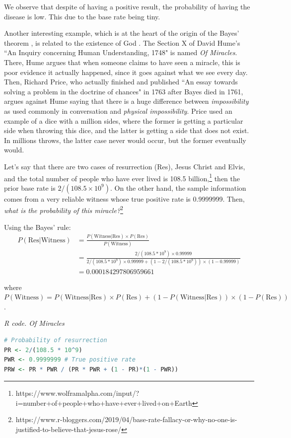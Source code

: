 We observe that despite of having a positive result, the probability of having the disease is low. This due to the base rate being tiny.

Another interesting example, which is at the heart of the origin of the Bayes' theorem \cite{bayes1763lii}, is related to the existence of God \cite{stigler2018richard}. The Section X of David Hume's ``An Inquiry concerning Human Understanding, 1748" is named \textit{Of Miracles}. There, Hume argues that when someone claims to have seen a miracle, this is poor evidence it actually happened, since it goes against what we see every day. Then, Richard Price, who actually finished and published ``An essay towards solving a problem in the doctrine of chances" in 1763 after Bayes died in 1761, argues against Hume saying that there is a huge difference between \textit{impossibility} as used commonly in conversation and \textit{physical impossibility}. Price used an example of a dice with a million sides, where the former is getting a particular side when throwing this dice, and the latter is getting a side that does not exist. In millions throws, the latter case never would occur, but the former eventually would.

Let's say that there are two cases of resurrection (Res), Jesus Christ and Elvis, and the total number of people who have ever lived is 108.5 billion,\footnote{https://www.wolframalpha.com/input/?i=number+of+people+who+have+ever+lived+on+Earth} then the prior base rate is $2/(108.5\times 10^{9})$. On the other hand, the sample information comes from a very reliable witness whose true positive rate is  0.9999999. Then, \textit{what is the probability of this miracle?}\footnote{https://www.r-bloggers.com/2019/04/base-rate-fallacy-or-why-no-one-is-justified-to-believe-that-jesus-rose/}

Using the Bayes' rule:
{\small{
\begin{align*}
	P(\text{Res}|\text{Witness}) & =  \frac{P(\text{Witness}|\text{Res})\times P(\text{Res})}{P(\text{Witness})}\\
	& =\frac{2/(108.5 * 10^9) \times 0.99999}{2/(108.5 * 10^9) \times 0.99999 + (1-2/(108.5 * 10^9)) \times (1-0.99999)}\\
	& = 0.000184297806959661
\end{align*}
}}

where $P(\text{Witness})=P(\text{Witness}|\text{Res})\times P(\text{Res})+(1-P(\text{Witness}|\text{Res}))\times (1-P(\text{Res}))$.

\begin{tcolorbox}[enhanced,width=4.67in,center upper,
	fontupper=\large\bfseries,drop shadow southwest,sharp corners]
\textit{R code. Of Miracles}
\begin{VF}
\begin{lstlisting}[basicstyle=\footnotesize, language=R]
# Probability of resurrection
PR <- 2/(108.5 * 10^9) 
PWR <- 0.9999999 # True positive rate
PRW <- PR * PWR / (PR * PWR + (1 - PR)*(1 - PWR)) 
\end{lstlisting}
\end{VF}
\end{tcolorbox}

